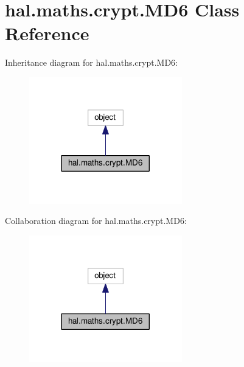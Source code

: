 \hypertarget{classhal_1_1maths_1_1crypt_1_1_m_d6}{}\section{hal.\+maths.\+crypt.\+M\+D6 Class Reference}
\label{classhal_1_1maths_1_1crypt_1_1_m_d6}


Inheritance diagram for hal.\+maths.\+crypt.\+M\+D6\+:\nopagebreak
\begin{figure}[H]
\begin{center}
\leavevmode
\includegraphics[width=188pt]{classhal_1_1maths_1_1crypt_1_1_m_d6__inherit__graph}
\end{center}
\end{figure}


Collaboration diagram for hal.\+maths.\+crypt.\+M\+D6\+:\nopagebreak
\begin{figure}[H]
\begin{center}
\leavevmode
\includegraphics[width=188pt]{classhal_1_1maths_1_1crypt_1_1_m_d6__coll__graph}
\end{center}
\end{figure}
